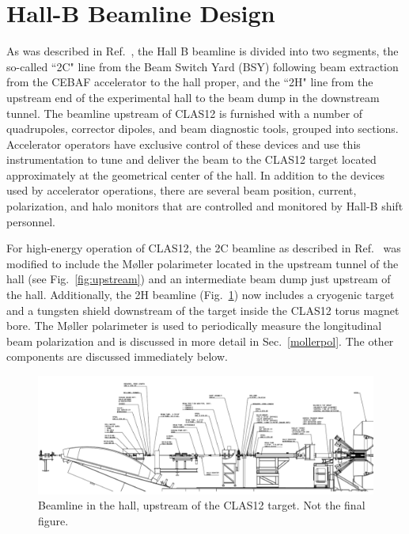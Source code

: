 
\section{Hall-B Beamline Design}
\label{beamlinedesign}

As was described in Ref.~\cite{HPSBeamline}, the Hall B beamline is divided into two segments, the so-called ``2C" line from the Beam 
Switch Yard (BSY) following beam extraction from the CEBAF accelerator to the hall proper, and the ``2H" line from the upstream end of 
the experimental hall to the beam dump in the downstream tunnel. The beamline upstream of CLAS12 is furnished with a number of 
quadrupoles, corrector dipoles, and beam diagnostic tools, grouped into sections. Accelerator operators have exclusive control of these 
devices and use this instrumentation to tune and deliver the beam to the CLAS12 target located approximately at the geometrical center of the 
hall. In addition to the devices used by accelerator operations, there are several beam position, current, polarization, and halo monitors that 
are controlled and monitored by Hall-B shift personnel. 

For high-energy operation of CLAS12, the 2C beamline as described in Ref.~\cite{HPSBeamline} was modified to include 
the M{\o}ller polarimeter located in the upstream tunnel of the hall (see Fig.~\ref{fig:upstream}) and an intermediate beam dump just upstream 
of the hall. Additionally, the 2H beamline  (Fig.~\ref{fig:hall1}) now includes a cryogenic target and a tungsten shield downstream of the 
target inside the CLAS12 torus magnet bore. The M{\o}ller polarimeter is used to periodically measure the longitudinal beam polarization and is discussed in more detail in Sec.~\ref{mollerpol}.  The other components are discussed immediately below.


\begin{figure}[t]
\begin{center}
\includegraphics[width=1.\textwidth]{beamline_hall_1.pdf}
\caption{Beamline in the hall, upstream of the CLAS12 target. {\color{red} Not the final figure.}}
\label{fig:hall1}
\end{center}
\end{figure}


